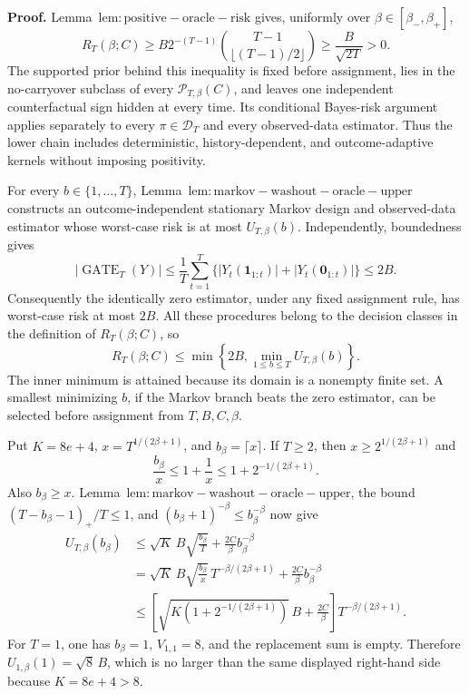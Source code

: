 \textbf{Proof.} Lemma~\(\mathrm{lem:positive-oracle-risk}\) gives, uniformly over \(\beta\in[\beta_-,\beta_+]\),
\[
R_T(\beta;C)
\ge B2^{-(T-1)}\binom{T-1}{\lfloor(T-1)/2\rfloor}
\ge\frac{B}{\sqrt{2T}}>0.
\]
The supported prior behind this inequality is fixed before assignment, lies in the no-carryover subclass of every \(\mathcal P_{T,\beta}(C)\), and leaves one independent counterfactual sign hidden at every time. Its conditional Bayes-risk argument applies separately to every \(\pi\in\mathcal D_T\) and every observed-data estimator. Thus the lower chain includes deterministic, history-dependent, and outcome-adaptive kernels without imposing positivity.

For every \(b\in\{1,\ldots,T\}\), Lemma~\(\mathrm{lem:markov-washout-oracle-upper}\) constructs an outcome-independent stationary Markov design and observed-data estimator whose worst-case risk is at most \(U_{T,\beta}(b)\). Independently, boundedness gives
\[
|\operatorname{GATE}_T(Y)|
\le\frac1T\sum_{t=1}^T\{|Y_t(\mathbf1_{1:t})|+|Y_t(\mathbf0_{1:t})|\}
\le2B.
\]
Consequently the identically zero estimator, under any fixed assignment rule, has worst-case risk at most \(2B\). All these procedures belong to the decision classes in the definition of \(R_T(\beta;C)\), so
\[
R_T(\beta;C)
\le\min\left\{2B,\min_{1\le b\le T}U_{T,\beta}(b)\right\}.
\]
The inner minimum is attained because its domain is a nonempty finite set. A smallest minimizing \(b\), if the Markov branch beats the zero estimator, can be selected before assignment from \(T,B,C,\beta\).

Put \(K=8e+4\), \(x=T^{1/(2\beta+1)}\), and \(b_\beta=\lceil x\rceil\). If \(T\ge2\), then \(x\ge2^{1/(2\beta+1)}\) and
\[
\frac{b_\beta}{x}\le1+\frac1x\le1+2^{-1/(2\beta+1)}.
\]
Also \(b_\beta\ge x\). Lemma~\(\mathrm{lem:markov-washout-oracle-upper}\), the bound \((T-b_\beta-1)_+/T\le1\), and \((b_\beta+1)^{-\beta}\le b_\beta^{-\beta}\) now give
\[
\begin{aligned}
U_{T,\beta}(b_\beta)
&\le \sqrt K\,B\sqrt{\frac{b_\beta}{T}}+\frac{2C}{\beta}b_\beta^{-\beta}\\
&=\sqrt K\,B\sqrt{\frac{b_\beta}{x}}\,T^{-\beta/(2\beta+1)}
 +\frac{2C}{\beta}b_\beta^{-\beta}\\
&\le\left[\sqrt{K\left(1+2^{-1/(2\beta+1)}\right)}\,B+\frac{2C}{\beta}\right]T^{-\beta/(2\beta+1)}.
\end{aligned}
\]
For \(T=1\), one has \(b_\beta=1\), \(V_{1,1}=8\), and the replacement sum is empty. Therefore \(U_{1,\beta}(1)=\sqrt8\,B\), which is no larger than the same displayed right-hand side because \(K=8e+4>8\).

